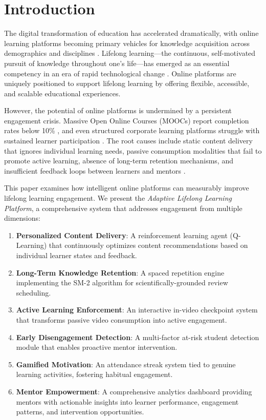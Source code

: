 \documentclass[conference]{IEEEtran}
\begin{document}
\section{Introduction}

The digital transformation of education has accelerated dramatically, with online learning platforms becoming primary vehicles for knowledge acquisition across demographics and disciplines \cite{b1}. Lifelong learning---the continuous, self-motivated pursuit of knowledge throughout one's life---has emerged as an essential competency in an era of rapid technological change \cite{b2}. Online platforms are uniquely positioned to support lifelong learning by offering flexible, accessible, and scalable educational experiences.

However, the potential of online platforms is undermined by a persistent engagement crisis. Massive Open Online Courses (MOOCs) report completion rates below 10\% \cite{b3}, and even structured corporate learning platforms struggle with sustained learner participation \cite{b4}. The root causes include static content delivery that ignores individual learning needs, passive consumption modalities that fail to promote active learning, absence of long-term retention mechanisms, and insufficient feedback loops between learners and mentors \cite{b5}.

This paper examines how intelligent online platforms can measurably improve lifelong learning engagement. We present the \textit{Adaptive Lifelong Learning Platform}, a comprehensive system that addresses engagement from multiple dimensions:

\begin{enumerate}
    \item \textbf{Personalized Content Delivery}: A reinforcement learning agent (Q-Learning) that continuously optimizes content recommendations based on individual learner states and feedback.
    \item \textbf{Long-Term Knowledge Retention}: A spaced repetition engine implementing the SM-2 algorithm for scientifically-grounded review scheduling.
    \item \textbf{Active Learning Enforcement}: An interactive in-video checkpoint system that transforms passive video consumption into active engagement.
    \item \textbf{Early Disengagement Detection}: A multi-factor at-risk student detection module that enables proactive mentor intervention.
    \item \textbf{Gamified Motivation}: An attendance streak system tied to genuine learning activities, fostering habitual engagement.
    \item \textbf{Mentor Empowerment}: A comprehensive analytics dashboard providing mentors with actionable insights into learner performance, engagement patterns, and intervention opportunities.
\end{enumerate}
\end{document}
